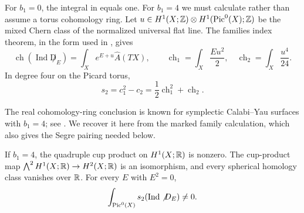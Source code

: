For \(b_1=0\), the integral in
 equals one.  For \(b_1=4\) we
must calculate rather than assume a torus cohomology ring.
Let
\(u\in H^1(X;\mathbb Z)\otimes H^1(\operatorname{Pic}^0(X);\mathbb Z)\)
be the mixed Chern class of the normalized universal flat line.
The families index theorem, in the form used in
\cite[Section~4.2]{LiLiu2001}, gives
\begin{equation}
 \label{eq:families-index-character}
 \operatorname{ch}(\operatorname{Ind}\not D_E)
       =\int_X e^{E+u}\widehat A(TX),
 \qquad
 \operatorname{ch}_1=\int_X\frac{Eu^2}{2},
 \quad
 \operatorname{ch}_2=\int_X\frac{u^4}{24}.
\end{equation}
In degree four on the Picard torus,
\begin{equation}
 \label{eq:families-segre-two}
 s_2=c_1^2-c_2=\frac12\operatorname{ch}_1^2
                          +\operatorname{ch}_2.
\end{equation}

The real cohomology-ring conclusion is known for symplectic
Calabi--Yau surfaces with \(b_1=4\); see
\cite[Proposition~7.8(4)]{Li2010SCY}.  We recover it here from the
marked family calculation, which also gives the Segre pairing needed
below.

\begin{proposition}
 \label{prop:cup-product}
 If \(b_1=4\), the quadruple cup product on \(H^1(X;\mathbb R)\)
 is nonzero.  The cup-product map
 \(\bigwedge^2H^1(X;\mathbb R)\to H^2(X;\mathbb R)\) is an isomorphism,
 and every spherical homology class vanishes over \(\mathbb R\).
 For every \(E\) with \(E^2=0\),
 \[
  \int_{\operatorname{Pic}^0(X)}s_2(\operatorname{Ind}\not D_E)\ne0.
 \]
\end{proposition}

